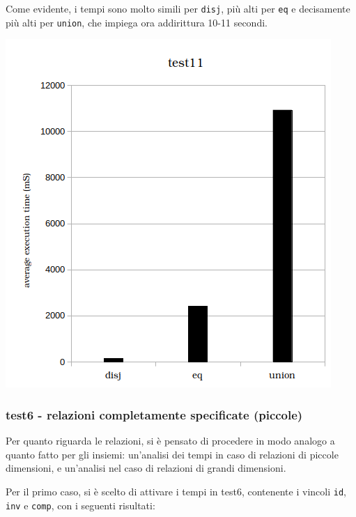 

Come evidente, i tempi sono molto simili per \texttt{disj}, più alti per \texttt{eq} e decisamente più alti per \texttt{union}, che impiega ora addirittura 10-11 secondi.\\

\begin{center}
\includegraphics[scale=0.8]{images/histogram_test11.png}
\end{center}

\subsubsection{test6 - relazioni completamente specificate (piccole)}

Per quanto riguarda le relazioni, si è pensato di procedere in modo analogo a quanto fatto per gli insiemi: un'analisi dei tempi in caso di relazioni di piccole dimensioni, e un'analisi nel caso di relazioni di grandi dimensioni.

Per il primo caso, si è scelto di attivare i tempi in test6, contenente i vincoli \texttt{id}, \texttt{inv} e \texttt{comp}, con i seguenti risultati:



